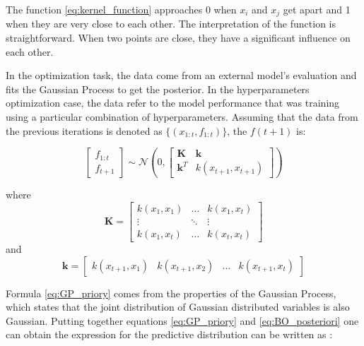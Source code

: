The function \ref{eq:kernel_function} approaches $0$ when $x_i$ and $x_j$ get apart and 1 when they are very close to each other. The interpretation of the function is straightforward. When two points are close, they have a significant influence on each other. 

In the optimization task, the data come from an external model's evaluation and fits the Gaussian Process to get the posterior. In the hyperparameters optimization case, the data refer to the model performance that was training using a particular combination of hyperparameters.     
Assuming that the data from the previous iterations is denoted as $\{ (x_{1:t}, f_{1:t}) \}$, the $f(t+1)$ is:

\begin{equation}
\label{eq:GP_priory}
    \begin{bmatrix}
         f_{1:t} \\
         f_{t+1}
        \end{bmatrix}  \sim  \mathcal{N}  \left( 0,  \begin{bmatrix}
         \mathbf{K} & \mathbf{k}  \\
         \mathbf{k}^{T} &  k(x_{t+1},x_{t+1})
        \end{bmatrix}  \right)  
\end{equation}

where 
\begin{equation}
    \mathbf{K} = \begin{bmatrix}
         k(x_{1},x_1) & \ldots  &  k(x_{1},x_t)  \\
          \vdots & \ddots & \vdots \\
           k(x_{1},x_t) & \ldots  &  k(x_{t},x_t)
        \end{bmatrix}
\end{equation}
and
\begin{equation}
    \mathbf{k} = \begin{bmatrix}
        k(x_{t+1},x_1) &  k(x_{t+1},x_2) &  \ldots & k(x_{t+1},x_t) 
        \end{bmatrix}
\end{equation}

Formula \ref{eq:GP_priory} comes from the properties of the Gaussian Process, which states that the joint distribution of Gaussian distributed variables is also Gaussian. Putting together equations \ref{eq:GP_priory} and \ref{eq:BO_posteriori} one can obtain the expression for the predictive distribution can be written as \cite{GaussianProcesses}: 

